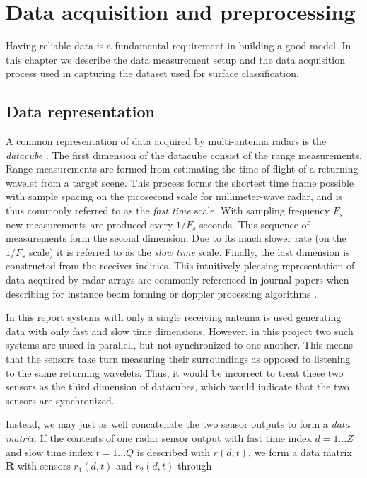 \chapter{Data acquisition and preprocessing}

Having reliable data is a fundamental requirement in building a good model. In this chapter we describe the data measurement setup and the data acquisition process used in capturing the dataset used for surface classification. 

\section{Data representation}

A common representation of data acquired by multi-antenna radars is the \emph{datacube} \citep{richards_2014}. The first dimension of the datacube consist of the range measurements. Range measurements are formed from estimating the time-of-flight of a returning wavelet from a target scene. This process forms the shortest time frame possible with sample spacing on the picosecond scale for millimeter-wave radar, and is thus commonly referred to as the \emph{fast time} scale. With sampling frequency $F_s$ new measurements are produced every $1/F_s$ seconds. This sequence of measurements form the second dimension. Due to its much slower rate (on the $1/F_s$ scale) it is referred to as the \emph{slow time} scale. Finally, the last dimension is constructed from the receiver indicies. This intuitively pleasing representation of data acquired by radar arrays are commonly referenced in journal papers when describing for instance beam forming or doppler processing algorithms \citep{gentile_donovan_2018}. 

In this report systems with only a single receiving antenna is used generating data with only fast and slow time dimensions. However, in this project two such systems are uused in parallell, but not synchronized to one another. This means that the sensors take turn measuring their surroundings as opposed to listening to the same returning wavelets. Thus, it would be incorrect to treat these two sensors as the third dimension of datacubes, which would indicate that the two sensors are synchronized.

Instead, we may just as well concatenate the two sensor outputs to form a \emph{data matrix}. If the contents of one radar sensor output with fast time index $d=1...Z$ and slow time index $t=1...Q$ is described with $r(d,t)$, we form a data matrix $\mathbf{R}$ with sensors $r_1(d,t)$ and $r_2(d,t)$ through

